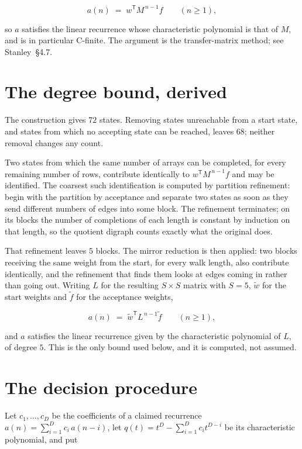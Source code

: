 \documentclass[11pt]{article}
\theoremstyle{definition}
\begin{document}
\[a(n) \;=\; w^{\mathsf T} M^{\,n-1} f \qquad (n \ge 1),\]

so $a$ satisfies the linear recurrence whose characteristic polynomial is that of $M$, and is in particular C-finite. The argument is the transfer-matrix method; see Stanley~\S4.7.

\section{The degree bound, derived}

The construction gives $72$ states. Removing states unreachable from a start state, and states from which no accepting state can be reached, leaves $68$; neither removal changes any count.

Two states from which the same number of arrays can be completed, for every remaining number of rows, contribute identically to $w^{\mathsf T}M^{\,n-1}f$ and may be identified. The coarsest such identification is computed by partition refinement: begin with the partition by acceptance and separate two states as soon as they send different numbers of edges into some block. The refinement terminates; on its blocks the number of completions of each length is constant by induction on that length, so the quotient digraph counts exactly what the original does.

That refinement leaves $5$ blocks. The mirror reduction is then applied: two blocks receiving the same weight from the start, for every walk length, also contribute identically, and the refinement that finds them looks at edges coming in rather than going out. Writing $L$ for the resulting $S \times S$ matrix with $S = 5$, $\tilde w$ for the start weights and $\tilde f$ for the acceptance weights,

\[a(n) \;=\; \tilde w^{\mathsf T} L^{\,n-1} \tilde f \qquad (n \ge 1),\]

and $a$ satisfies the linear recurrence given by the characteristic polynomial of $L$, of degree $5$. This is the only bound used below, and it is computed, not assumed.

\section{The decision procedure}

Let $c_1,\dots,c_D$ be the coefficients of a claimed recurrence $a(n) = \sum_{i=1}^{D} c_i\,a(n-i)$, let $q(t) = t^{D} - \sum_{i=1}^{D} c_i t^{D-i}$ be its characteristic polynomial, and put
\end{document}
